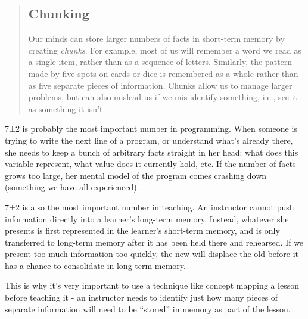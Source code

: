 \begin{quotation}   %
\subsection*{Chunking}

Our minds can store larger numbers of facts in short-term memory by creating \emph{chunks}.
For example, most of us will remember a word we read as a single item, rather
than as a sequence of letters.
Similarly, the pattern made by five spots on cards or dice is remembered as a whole
rather than as five separate pieces of information.
Chunks allow us to manage larger problems,
but can also mislead us if we mis-identify something,
i.e.,
see it as something it isn't.
\end{quotation}   %

7±2 is probably the most important number in programming.
When someone is trying to write the next line of a program,
or understand what's already there,
she needs to keep a bunch of arbitrary facts straight in her head:
what does this variable represent,
what value does it currently hold,
etc.
If the number of facts grows too large,
her mental model of the program comes crashing down
(something we have all experienced).

7±2 is also the most important number in teaching.
An instructor cannot push information directly into a learner's long-term memory.
Instead,
whatever she presents is first represented in the learner's short-term memory,
and is only transferred to long-term memory after it has been held there and rehearsed.
If we present too much information too quickly,
the new will displace the old before it has a chance to consolidate in long-term
memory.

This is why it's very important to use a technique like concept mapping a lesson
before teaching it - an instructor needs to identify just how many pieces of
separate information will need to be ``stored'' in memory as part of the lesson.
